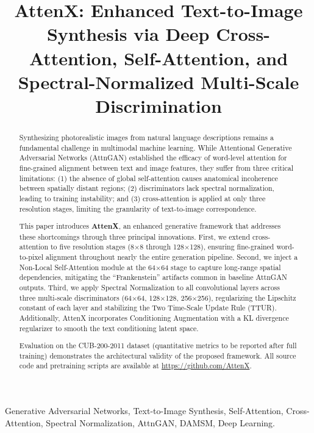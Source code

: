 \documentclass[conference]{IEEEtran}
\begin{document}
\title{AttenX: Enhanced Text-to-Image Synthesis via Deep Cross-Attention, Self-Attention, and Spectral-Normalized Multi-Scale Discrimination}

\maketitle

\begin{abstract}
Synthesizing photorealistic images from natural language descriptions remains a fundamental challenge in multimodal machine learning. While Attentional Generative Adversarial Networks (AttnGAN) established the efficacy of word-level attention for fine-grained alignment between text and image features, they suffer from three critical limitations: (1) the absence of global self-attention causes anatomical incoherence between spatially distant regions; (2) discriminators lack spectral normalization, leading to training instability; and (3) cross-attention is applied at only three resolution stages, limiting the granularity of text-to-image correspondence.

This paper introduces \textbf{AttenX}, an enhanced generative framework that addresses these shortcomings through three principal innovations. First, we extend cross-attention to five resolution stages (8$\times$8 through 128$\times$128), ensuring fine-grained word-to-pixel alignment throughout nearly the entire generation pipeline. Second, we inject a Non-Local Self-Attention module at the 64$\times$64 stage to capture long-range spatial dependencies, mitigating the ``Frankenstein'' artifacts common in baseline AttnGAN outputs. Third, we apply Spectral Normalization to all convolutional layers across three multi-scale discriminators (64$\times$64, 128$\times$128, 256$\times$256), regularizing the Lipschitz constant of each layer and stabilizing the Two Time-Scale Update Rule (TTUR). Additionally, AttenX incorporates Conditioning Augmentation with a KL divergence regularizer to smooth the text conditioning latent space.

Evaluation on the CUB-200-2011 dataset (quantitative metrics to be reported after full training) demonstrates the architectural validity of the proposed framework. All source code and pretraining scripts are available at \url{https://github.com/AttenX}.
\end{abstract}

\begin{IEEEkeywords}
Generative Adversarial Networks, Text-to-Image Synthesis, Self-Attention, Cross-Attention, Spectral Normalization, AttnGAN, DAMSM, Deep Learning.
\end{IEEEkeywords}
\end{document}
